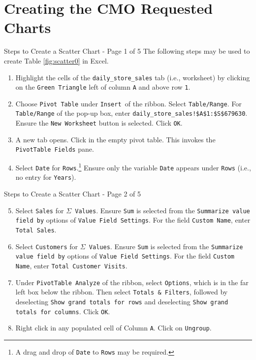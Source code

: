 \documentclass[pdf]{beamer}
\theoremstyle{remark}
\theoremstyle{definition}
\begin{document}
\section{Creating the CMO Requested Charts}

\begin{frame}[t]{Steps to Create a Scatter Chart - Page 1 of 5}
\setcounter{table}{0}
 The following steps may be used to create Table \ref{fig:scatter0} in Excel. \\
 \vspace{0.5ex}
 \small 
\begin{enumerate}
 \item  Highlight the cells of the \texttt{daily\_store\_sales} tab (i.e., worksheet) by clicking on the \texttt{Green Triangle} left of column \texttt{A} and above row \texttt{1}.
 \item Choose \texttt{Pivot Table} under \texttt{Insert }of the ribbon. Select \texttt{Table/Range}.  For \texttt{Table/Range} of the pop-up box, enter \texttt{daily\_store\_sales!\$A\$1:\$S\$679630}. Ensure the \texttt{New Worksheet} button is selected.  Click \texttt{OK}.
\item A new tab opens.  Click in the empty pivot table.  This invokes the \texttt{PivotTable Fields} pane. 
\item Select \texttt{Date} for \texttt{Rows}.\footnote{A drag and drop of \texttt{Date} to \texttt{Rows} may be required.}  Ensure only the variable \texttt{Date} appears under \texttt{Rows} (i.e., no entry for \texttt{Years}). 
\end{enumerate}
\end{frame}

\begin{frame}[t]{Steps to Create a Scatter Chart - Page 2 of 5}
 \small 
\begin{enumerate}
\setcounter{enumi}{4}
\item Select \texttt{Sales} for \texttt{$\Sigma$ Values}. Ensure \texttt{Sum} is selected from the \texttt{Summarize value field by} options of \texttt{Value Field Settings}.  For the field \texttt{Custom Name}, enter \texttt{Total Sales}.
\item Select \texttt{Customers} for \texttt{$\Sigma$ Values}. Ensure \texttt{Sum} is selected from the \texttt{Summarize value field by} options of \texttt{Value Field Settings}.  For the field \texttt{Custom Name}, enter \texttt{Total Customer Visits}.
\item Under \texttt{PivotTable Analyze} of the ribbon, select \texttt{Options}, which is in the far left box below the ribbon.  Then select \texttt{Totals \& Filters}, followed by deselecting \texttt{Show grand totals for rows} and deselecting \texttt{Show grand totals for columns}. Click \texttt{OK}.
 \item Right click in any populated cell of Column \texttt{A}. Click on \texttt{Ungroup}. 
\end{enumerate}
\end{frame}
\end{document}
